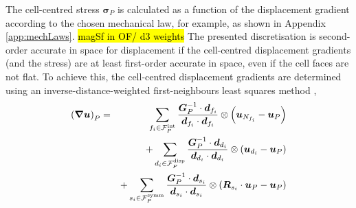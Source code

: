 \documentclass[sn-mathphys,Numbered]{sn-jnl}%
\newcommand{\bb}{\boldsymbol}
\begin{document}
The cell-centred stress $\bb{\sigma}_P$ is calculated as a function of the displacement gradient according to the chosen mechanical law, for example, as shown in Appendix \ref{app:mechLaws}.
\hl{magSf in OF/ d3 weights}
The presented discretisation is second-order accurate in space for displacement if the cell-centred displacement gradients (and the stress) are at least first-order accurate in space, even if the cell faces are not flat.
To achieve this, the cell-centred displacement gradients are determined using an inverse-distance-weighted first-neighbours least squares method \citep{Jasak1996},
\begin{eqnarray} \label{eq:leastSquaresGrad}
	\left(\bb{\nabla}\bb{u}\right)_P
		&=&\sum_{f_i \in \mathcal{F}^{\text{int}}_P} \frac{\bb{G}^{-1}_P \cdot \bb{d}_{f_i}}{\bb{d}_{f_i} \cdot \bb{d}_{f_i}}  \otimes \left(\bb{u}_{N_{f_i}} - \bb{u}_P \right) \notag \\
		&&+ \sum_{d_i \in \mathcal{F}^{\text{disp}}_P} \frac{ \bb{G}^{-1}_P \cdot \bb{d}_{d_i} }{\bb{d}_{d_i} \cdot \bb{d}_{d_i}} \otimes \left(\bb{u}_{d_i} - \bb{u}_P \right) \notag \\
		&&+ \sum_{s_i \in \mathcal{F}^{\text{symm}}_P} \frac{\bb{G}^{-1}_P \cdot \bb{d}_{s_i}}{\bb{d}_{s_i} \cdot \bb{d}_{s_i}} \otimes \left(\bb{R}_{s_i} \cdot \bb{u}_P - \bb{u}_P \right)
\end{eqnarray}
\end{document}
